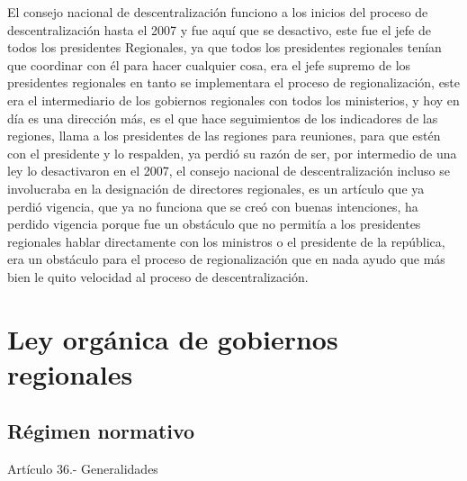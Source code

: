 \documentclass[
  jou,
  floatsintext,
  longtable,
  a4paper,
  nolmodern,
  notxfonts,
  notimes,
  12pt,
  colorlinks=true,linkcolor=blue,citecolor=blue,urlcolor=blue]{apa7}
\begin{document}
El consejo nacional de descentralización funciono a los inicios del
proceso de descentralización hasta el 2007 y fue aquí que se desactivo,
este fue el jefe de todos los presidentes Regionales, ya que todos los
presidentes regionales tenían que coordinar con él para hacer cualquier
cosa, era el jefe supremo de los presidentes regionales en tanto se
implementara el proceso de regionalización, este era el intermediario de
los gobiernos regionales con todos los ministerios, y hoy en día es una
dirección más, es el que hace seguimientos de los indicadores de las
regiones, llama a los presidentes de las regiones para reuniones, para
que estén con el presidente y lo respalden, ya perdió su razón de ser,
por intermedio de una ley lo desactivaron en el 2007, el consejo
nacional de descentralización incluso se involucraba en la designación
de directores regionales, es un artículo que ya perdió vigencia, que ya
no funciona que se creó con buenas intenciones, ha perdido vigencia
porque fue un obstáculo que no permitía a los presidentes regionales
hablar directamente con los ministros o el presidente de la república,
era un obstáculo para el proceso de regionalización que en nada ayudo
que más bien le quito velocidad al proceso de descentralización.

\section{Ley orgánica de gobiernos
regionales}\label{ley-orguxe1nica-de-gobiernos-regionales}

\subsection{Régimen normativo}\label{ruxe9gimen-normativo}

Artículo 36.- Generalidades
\end{document}
